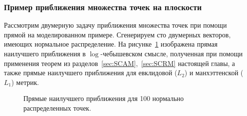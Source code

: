 \documentclass[specialist,
               substylefile = spbu.rtx,
               subf,href,colorlinks=true, 12pt]{disser}
\theoremstyle{definition}
\begin{document}
\subsubsection{Пример приближения множества точек на плоскости}
Рассмотрим двумерную задачу приближения множества точек при помощи прямой на моделированном примере. Сгенерируем сто двумерных векторов, имеющих нормальное распределение. %
На рисунке~\ref{fig:linenormnoiseuni} изображена прямая наилучшего приближения в $\log$-чебышевском смысле, полученная при помощи применения теорем из разделов~\ref{sec:SCAM},~\ref{sec:SCRM} настоящей главы, а также прямые наилучшего приближения для евклидовой ($L_{2}$) и манхэттенской ($L_{1}$) метрик.
\begin{figure}[h]
\caption{Прямые наилучшего приближения для 100 нормально распределенных точек.}
\label{fig:linenormnoiseuni}
\end{figure}
\end{document}
